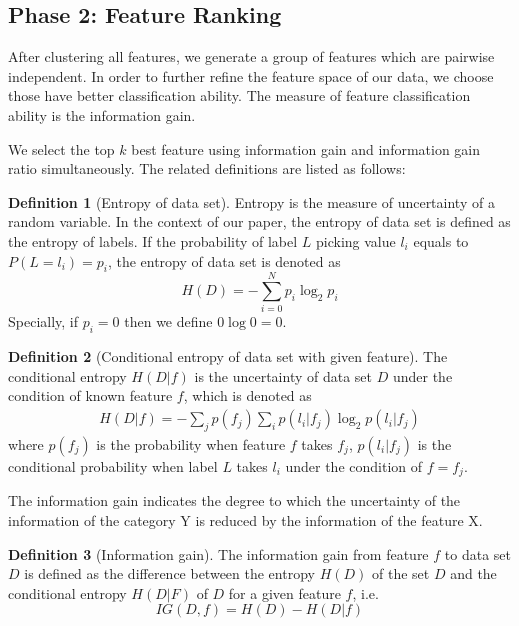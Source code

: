 \documentclass{ieeeaccess}
\theoremstyle{definition}
\newtheorem{defn}{Definition}
\begin{document}
\subsection{Phase 2: Feature Ranking}

After clustering all features, we generate a group of features which are pairwise independent. In order to further refine the feature space of our data, we choose those have better classification ability. The measure of feature classification ability is the information gain.

We select the top $k$ best feature using information gain and information gain ratio simultaneously. The related definitions are listed as follows:

\begin{defn}[Entropy of data set]
    Entropy\cite{Shannon1948} is the measure of uncertainty of a random variable. In the context of our paper, the entropy of data set is defined as the entropy of labels. If the probability of label $L$ picking value $l_i$ equals to $P(L=l_i)=p_i$, the entropy of data set is denoted as
\begin{equation}
    H(D) = -\sum_{i=0}^N p_i \log_2 p_i
\end{equation}
    Specially, if $p_i=0$ then we define $0\log0 = 0$.
\end{defn}

\begin{defn}[Conditional entropy of data set with given feature]
The conditional entropy $H(D|f)$ is the uncertainty of data set $D$ under the condition of known feature $f$, which is denoted as
\begin{align}
    H(D|f)=-\sum_{j} p(f_j) \sum_{i} p(l_i|f_j) \log_2 p(l_i|f_j)
\end{align}
where $p(f_j)$ is the probability when feature $f$ takes $f_j$, $p(l_i|f_j)$ is the conditional probability when label $L$ takes $l_i$ under the condition of $f=f_j$.
\end{defn}

The information gain indicates the degree to which the uncertainty of the information of the category Y is reduced by the information of the feature X.

\begin{defn}[Information gain]
    The information gain from feature $f$ to data set $D$ is defined as the difference between the entropy $H(D)$ of the set $D$ and the conditional entropy $H(D|F)$ of $D$ for a given feature $f$, i.e.
\begin{equation}
    IG(D, f) = H(D) - H(D|f)
\end{equation}
\end{defn}
\end{document}
